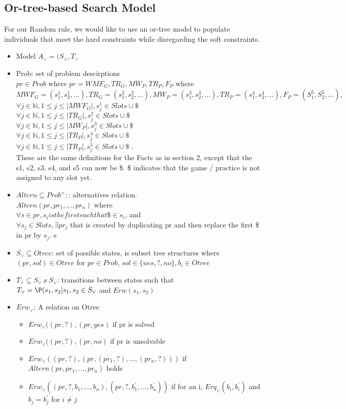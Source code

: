 \documentclass[12 pt]{article}        	%
\begin{document}
\subsection{Or-tree-based Search Model}
For our Random rule, we would like to use an or-tree model to populate individuals that meet the
hard constraints while disregarding the soft constraints.
\begin{itemize}
    \item Model $A_{\lor} = (S_{\lor}, T_{\lor}$
    \item Prob: set of problem descirptions
    \\ $pr \in Prob $ where $pr = WMF_G, TR_G, MW_P, TR_P, F_P$ where $ MWF_G = (s_1^1, s_2^1, ...), TR_G = (s_1^2, s_2^2, ...), 
MW_P = (s_1^3, s_2^3, ...), 
TR_P = (s_1^4, s_2^4, ...), 
F_P = (S_1^5, S_2^5, ...), $
\\
$\forall j \in \mathbb{N}, 1 \le j \le |MWF_G|, s_j^1 \in Slots \cup \$$  \\
$\forall j \in \mathbb{N}, 1 \le j \le |TR_G|, s_j^2 \in Slots \cup \$$  \\
$\forall j \in \mathbb{N}, 1 \le j \le |MW_P|, s_j^3 \in Slots \cup \$$  \\
$\forall j \in \mathbb{N}, 1 \le j \le |TR_P|, s_j^4 \in Slots \cup \$$ \\
$\forall j \in \mathbb{N}, 1 \le j \le |TR_P|, s_j^5 \in Slots \cup \$$ . 
\\ These are the same definitions for the Facts as in section 2, except that the s1, s2, s3, s4, and s5 can now be \$. \$ indicates that the game / practice is not assigned to any slot yet.
\item $Altern \subseteq Prob^+:$: alternatives relation.
\\ $Altern(pr, pr_1, ..., pr_n)$ where
\\ $\forall s \in pr, s_i is the first such that \$ \in s_i$, and
\\ $\forall s_j \in Slots, \exists pr_j$ that is created by duplicating pr and then replace the first \$ in pr by $s_j$. s
\item $S_{\lor} \subseteq Otree$: set of possible states, is subset tree structures where 
\\ $(pr, sol) \in Otree$ for $pr\in Prob$, $sol \in \{ues, ?, no\}, b_i \in Otree$
\item $T_{\lor} \subseteq S_{\lor} \: x \: S_{\lor}$: transitions between states such that 
\\ $T_{\lor} = \P(s_1, s_2|s_1, s_2 \in S_{\lor}$ and $Erw(s_1, s_2)$
\item $Erw_{\lor}$: A relation on Otree
\begin{itemize}
    \item $Erw_{\lor}((pr, ?), (pr, yes)$ if pr is solved
    \item $Erw_{\lor}((pr, ?), (pr, no)$ if pr is unsolvable
    \item $Erw_{\lor}((pr, ?), (pr, (pr_1, ?), ..., (pr_n, ?)))$ if $Altern(pr, pr_1, ..., pr_n)$ holds
    \item $Erw_{\lor}((pr, ?, b_1, ..., b_n), (pr, ?, b_{1}^{'}, ..., b_{n}^{'}))$ if for an i, $Erq_{\lor}(b_i, b_{i}^{'})$ and $b_j = b_{j}^{'}$ for $i \neq j$
\end{itemize}
\end{itemize}
\end{document}
